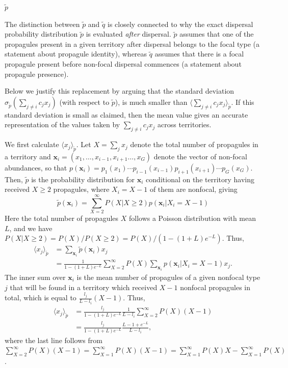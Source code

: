 \documentclass[12pt]{article}
\begin{document}
$\tilde{p}$


The distinction between $\tilde{p}$ and $\tilde{q}$ is closely connected to why the exact dispersal probability distribution $\tilde{p}$ is evaluated \textit{after} dispersal. $\tilde{p}$ assumes that one of the propagules present in a given territory after dispersal belongs to the focal type (a statement about propagule identity), whereas $\tilde{q}$ assumes that there is a focal propagule present before non-focal dispersal commences (a statement about propagule presence). 



Below we justify this replacement by arguing that the standard deviation $\sigma_{\tilde{p}}(\sum_{j\neq i} c_j x_j)$ (with respect to $\tilde{p}$), is much smaller than $\langle\sum_{j\neq i} c_j x_j\rangle_{\tilde{p}}$. If this standard deviation is small as claimed, then the mean value gives an accurate representation of the values taken by $\sum_{j\neq i} c_j x_j$ across territories. 

We first calculate $\langle x_j \rangle_{\tilde{p}}$. Let $X=\sum_j x_j$ denote the total number of propagules in a territory and ${\mathbf x_i}=(x_1,\ldots,x_{i-1},x_{i+1}\ldots,x_G)$ denote the vector of non-focal abundances, so that $p({\mathbf x_i})=p_1(x_1)\cdots p_{i-1}(x_{i-1})p_{i+1}(x_{i+1})\cdots p_G(x_G)$. Then, $\tilde{p}$ is the probability distribution for ${\mathbf x_i}$ conditional on the territory having received $X\geq 2$ propagules, where $X_i=X-1$ of them are nonfocal, giving
\begin{equation}
\tilde{p}({\mathbf x_i})=\sum_{X=2}^{\infty}P(X|X\geq 2) p({\mathbf x_i}|X_i=X-1)
\end{equation}
Here the total number of propagules $X$ follows a Poisson distribution with mean $L$, and we have $P(X|X\geq 2)=P(X)/P(X\geq 2)=P(X)/(1-(1+L)e^{-L})$. Thus,
\begin{align}
\langle x_j \rangle_{\tilde{p}}&=\sum_{\mathbf x_i} \tilde{p}({\mathbf x_i})x_j\nonumber\\
&=\frac{1}{1-(1+L)e^{-L}}\sum_{X=2}^{\infty} P(X) \sum_{\mathbf x_i} p({\mathbf x_i}|X_i=X-1)x_j.
\label{eq:raremonster1}
\end{align}
The inner sum over ${\mathbf x_i}$ is the mean number of propagules of a given nonfocal type $j$ that will be found in a territory which received $X-1$ nonfocal propagules in total, which is equal to $\frac{l_j}{L-l_i}(X-1)$. Thus, 
\begin{align}
\langle x_j \rangle_{\tilde{p}}&=\frac{l_j}{1-(1+L)e^{-L}}\frac{1}{L-l_i}\sum_{X=2}^{\infty} P(X) (X-1)\nonumber\\
&=\frac{l_j}{1-(1+L)e^{-L}}\frac{L-1+e^{-L}}{L-l_i},
\label{eq:meanxjrare}
\end{align}
where the last line follows from $\sum_{X=2}^{\infty} P(X)(X-1)=\sum_{X=1}^{\infty} P(X)(X-1)=\sum_{X=1}^{\infty} P(X)X-\sum_{X=1}^{\infty}P(X)$.
\end{document}
